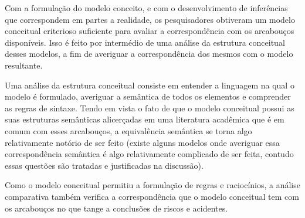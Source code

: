 Com a formulação do modelo conceito, e com o desenvolvimento de inferências que correspondem em partes a realidade, os pesquisadores obtiveram um modelo conceitual criterioso suficiente para avaliar a correspondência com os arcabouços disponíveis. Isso é feito por intermédio de uma análise da estrutura conceitual desses modelos, a fim de averiguar a correspondência dos mesmos com o modelo resultante.

Uma análise da estrutura conceitual consiste em entender a linguagem na qual o modelo é formulado, averiguar a semântica de todos os elementos e comprender as regras de sintaxe. Tendo em vista o fato de que o modelo conceitual possui as suas estruturas semânticas alicerçadas em uma literatura acadêmica que é em comum com esses arcabouços, a equivalência semântica se torna algo relativamente notório de ser feito (existe alguns modelos onde averiguar essa correspondência semântica é algo relativamente complicado de ser feita, contudo essas questões são tratadas e justificadas na discussão).

Como o modelo conceitual permitiu a formulação de regras e raciocínios, a análise comparativa também verifica a correspondência que o modelo conceitual tem com os arcabouços no que tange a conclusões de riscos e acidentes.